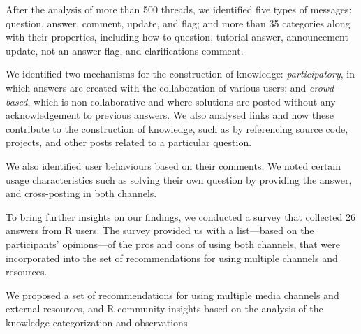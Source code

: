 \documentclass{sig-alternate-05-2015}
\begin{document}
	After the analysis of more than 500 threads, we identified five types of messages: question, answer, comment, update, and flag; and more than 35 categories along with their properties, including how-to question, tutorial answer, announcement update, not-an-answer flag, and clarifications comment.

	We identified two mechanisms for the construction of knowledge: \emph{participatory}, in which answers are created with the collaboration of various users; and \emph{crowd-based}, which is non-collaborative and where solutions are posted without any acknowledgement to previous answers.
	We also analysed links and how these contribute to the construction of knowledge, such as by referencing source code, projects, and other posts related to a particular question.

	We also identified user behaviours based on their comments.
	We noted certain usage characteristics such as solving their own question by providing the answer, and cross-posting in both channels.

	To bring further insights on our findings, we conducted a survey that collected 26 answers from R users.
	The survey provided us with a list---based on the participants' opinions---of the pros and cons of using both channels, that were incorporated into the set of recommendations for using multiple channels and resources.

	We proposed a set of recommendations for using multiple media channels and external resources, and R community insights based on the analysis of the knowledge categorization and observations.




\end{document}
